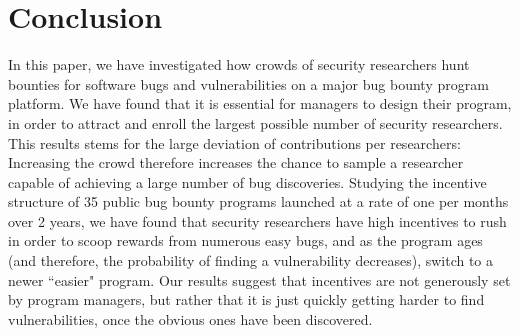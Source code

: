 \section{Conclusion}
\label{sec:conclusion}
In this paper, we have investigated how crowds of security researchers hunt bounties for software bugs and vulnerabilities on a major bug bounty program platform. We have found that it is essential for managers to design their program, in order to attract and enroll the largest possible number of security researchers. This results stems for the large deviation of contributions per researchers: Increasing the crowd therefore increases the chance to sample a researcher capable of achieving a large number of bug discoveries. Studying the incentive structure of 35 public bug bounty programs launched at a rate of one per months over 2 years, we have found that security researchers have high incentives to rush in order to scoop rewards from numerous easy bugs, and as the program ages (and therefore, the probability of finding a vulnerability decreases), switch to a newer ``easier" program. Our results suggest that incentives are not generously set by program managers, but rather that it is just quickly getting harder to find vulnerabilities, once the obvious ones have been discovered.